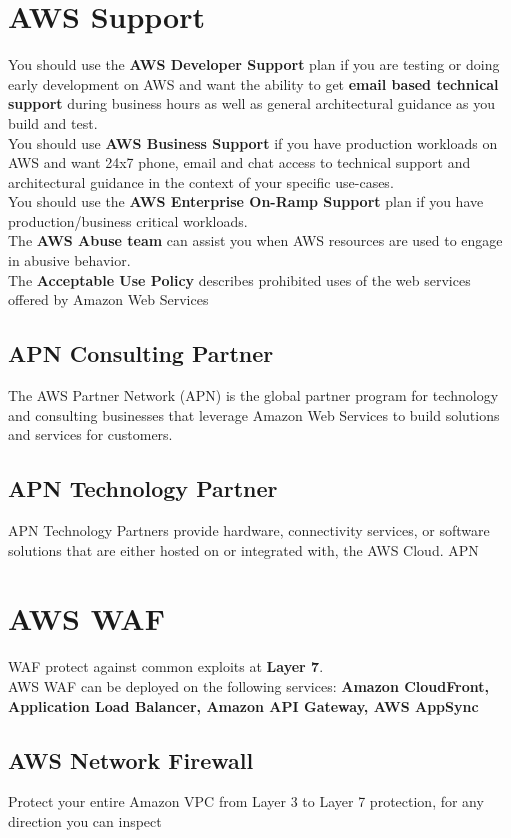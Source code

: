 \documentclass[12pt, letterpaper, twoside]{article}
\begin{document}
\section{AWS Support}
You should use the \textbf{AWS Developer Support} plan if you are testing or doing early development on AWS and want the ability 
to get \textbf{email based technical support} during business hours as well as general architectural guidance as you build and test.\\ 
You should use \textbf{AWS Business Support} if you have production workloads on AWS and want 24x7 phone, email and chat
access to technical support and architectural guidance in the context of your specific use-cases.\\
You should use the \textbf{AWS Enterprise On-Ramp Support} plan if you have production/business critical workloads.\\

The \textbf{AWS Abuse team} can assist you when AWS resources are used to engage in abusive behavior.\\

The \textbf{Acceptable Use Policy} describes prohibited uses of the web services offered by Amazon Web Services

\subsection{APN Consulting Partner}
The AWS Partner Network (APN) is the global partner program for technology and consulting businesses that leverage 
Amazon Web Services to build solutions and services for customers.

\subsection{APN Technology Partner}
APN Technology Partners provide hardware, connectivity services, or software solutions that are either hosted on or integrated with, the AWS Cloud. APN

\section{AWS WAF}
WAF protect against common exploits at \textbf{Layer 7}.\\
AWS WAF can be deployed on the following services:
\textbf{Amazon CloudFront, Application Load Balancer, Amazon API Gateway, AWS AppSync}

\subsection{AWS Network Firewall}
Protect your entire Amazon VPC from Layer 3 to Layer 7 protection, for any direction you can inspect
\end{document}
